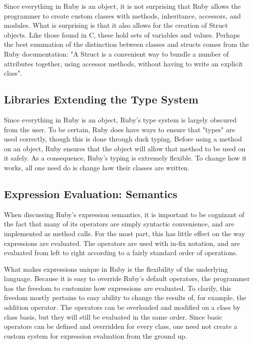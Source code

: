\documentclass[12pt]{article}
\begin{document}
Since everything in Ruby is an object, it is not surprising that Ruby allows the programmer to create custom classes with methods, inheritance, accessors, and modules. What is surprising is that it also allows for the creation of Struct objects. Like those found in C, these hold sets of variables and values. Perhaps the best summation of the distinction between classes and structs comes from the Ruby documentation: "A Struct is a convenient way to bundle a number of attributes together, using accessor methods, without having to write an explicit class"\cite{docs_struct}.

\subsection{Libraries Extending the Type System}
Since everything in Ruby is an object, Ruby's type system is largely obscured from the user. To be certain, Ruby does have ways to ensure that "types" are used correctly, though this is done through duck typing. Before using a method on an object, Ruby ensures that the object will allow that method to be used on it safely. As a consequence, Ruby's typing is extremely flexible. To change how it works, all one need do is change how their classes are written.

\subsection{Expression Evaluation: Semantics}
When discussing Ruby's expression semantics, it is important to be cognizant of the fact that many of its operators are simply syntactic convenience, and are implemented as method calls\cite{opstut}. For the most part, this has little effect on the way expressions are evaluated. The operators are used with in-fix notation, and are evaluated from left to right according to a fairly standard order of operations.

What makes expressions unique in Ruby is the flexibility of the underlying language. Because it is easy to override Ruby's default operators, the programmer has the freedom to customize how expressions are evaluated\cite{generalRb}. To clarify, this freedom mostly pertains to easy ability to change the results of, for example, the addition operator. The operators can be overloaded and modified on a class by class basis, but they will still be evaluated in the same order. Since basic operators can be defined and overridden for every class, one need not create a custom system for expression evaluation from the ground up.
\end{document}
